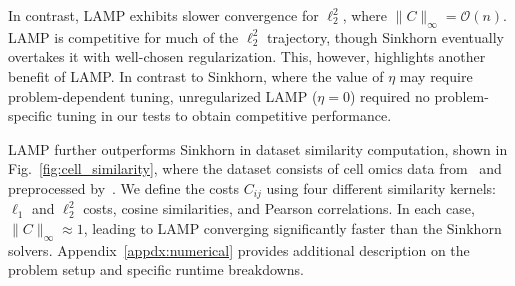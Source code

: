 \documentclass[10pt]{article}
\theoremstyle{plain}
\theoremstyle{definition}
\theoremstyle{remark}
\begin{document}
In contrast, LAMP exhibits slower convergence for $\ell_2^2$, where $\|C\|_\infty=\mathcal{O}(n)$. LAMP is competitive for much of the $\ell_2^2$ trajectory, though Sinkhorn eventually overtakes it with well-chosen regularization. This, however, highlights another benefit of LAMP. In contrast to Sinkhorn, where the value of $\eta$ may require problem-dependent tuning, unregularized LAMP ($\eta=0$) required no problem-specific tuning in our tests to obtain competitive performance.


LAMP further outperforms Sinkhorn in dataset similarity computation, shown in Fig.~\ref{fig:cell_similarity}, where the dataset consists of cell omics data from~\cite{liu2019deconvolution} and preprocessed by~\cite{huizingOptimalTransportImproves2022}. We define the costs $C_{ij}$ using four different similarity kernels: $\ell_1$ and $\ell_2^2$ costs, cosine similarities, and Pearson correlations. In each case, $\|C\|_\infty\approx 1$, leading to LAMP converging significantly faster than the Sinkhorn solvers. Appendix~\ref{appdx:numerical} provides additional description on the problem setup and specific runtime breakdowns.
\end{document}
